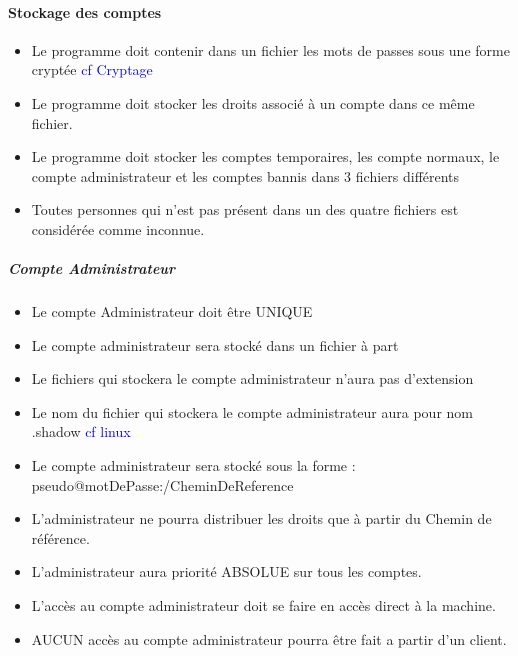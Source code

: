 \documentclass[10pt,a4paper]{report}
\begin{document}
\paragraph{Stockage des comptes}
	\begin{itemize}[label = $\triangleright$]
		\item Le programme doit contenir dans un fichier les mots de passes sous une forme cryptée \textcolor{blue}{cf Cryptage}
		\item Le programme doit stocker les droits associé à un compte dans ce même fichier.
		\item Le programme doit stocker les comptes temporaires, les compte normaux, le compte administrateur et les comptes bannis dans 3 fichiers différents
		\item Toutes personnes qui n'est pas présent dans un des quatre fichiers est considérée comme inconnue.
	\end{itemize}
		
	\subparagraph{Compte Administrateur}
		\begin{itemize}[label = $\triangleright$]
			\item Le compte Administrateur doit être UNIQUE
			\item Le compte administrateur sera stocké dans un fichier à part
			\item Le fichiers qui stockera le compte administrateur n'aura pas d'extension
			\item Le nom du fichier qui stockera le compte administrateur aura pour nom .shadow \textcolor{blue}{cf linux}
			\item Le compte administrateur sera stocké sous la forme : pseudo@motDePasse:/CheminDeReference
			\item L'administrateur ne pourra distribuer les droits que à partir du Chemin de référence.
			\item L'administrateur aura priorité ABSOLUE sur tous les comptes.
			\item L'accès au compte administrateur doit se faire en accès direct à la machine. 
			\item AUCUN accès au compte administrateur pourra être fait a partir d'un client.
		\end{itemize}
		
\end{document}
